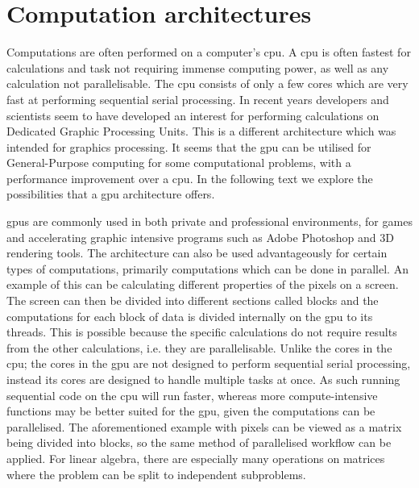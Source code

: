 \section{Computation architectures}
\label{sec:comparch}
Computations are often performed on a computer's  \acrshort{cpu}.
A \acrshort{cpu} is often fastest for calculations and task not requiring immense computing power, as well as any calculation not parallelisable.
The \acrshort{cpu} consists of only a few cores which are very fast at performing sequential serial processing. \citep{whatisgpu}
In recent years developers and scientists seem to have developed an interest for performing calculations on Dedicated Graphic Processing Units. \citep{gpurise}
This is a different architecture which was intended for graphics processing.
It seems that the \acrshort{gpu} can be utilised for General-Purpose computing for some computational problems, with a performance improvement over a \acrshort{cpu}.
In the following text we explore the possibilities that a \acrshort{gpu} architecture offers.

\acrshort{gpu}s are commonly used in both private and professional environments, for games and accelerating graphic intensive programs such as Adobe Photoshop and 3D rendering tools. \citep{NVIDIAADOBE,STEAMHW}
The  architecture can also be used advantageously for certain types of computations, primarily computations which can be done in parallel. 
An example of this can be calculating different properties of the pixels on a screen. 
The screen can then be divided into different sections called blocks and the computations for each block of data is divided internally on the \acrshort{gpu} to its threads.
This is possible because the specific calculations do not require results from the other calculations, i.e. they are parallelisable.
Unlike the cores in the \acrshort{cpu}; the cores in the \acrshort{gpu} are not designed to perform sequential serial processing, instead its cores are designed to handle multiple tasks at once. 
As such running sequential code on the \acrshort{cpu} will run faster, whereas more compute-intensive functions may be better suited for the \acrshort{gpu}, given the computations can be parallelised. \citep{NvidiaGPGPU}
The aforementioned example with pixels can be viewed as a matrix being divided into blocks, so the same method of parallelised workflow can be applied. 
For linear algebra, there are especially many operations on matrices where the problem can be split to independent subproblems.


